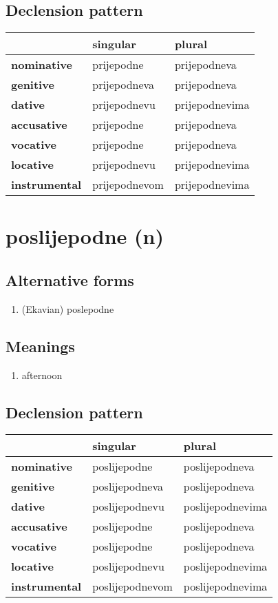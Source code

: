 \subsection*{Declension pattern}
\begin{tabularx}{\linewidth}{Xll}
\toprule
{} &       singular &          plural \\
\midrule
\textbf{nominative  } &     prijepodne &    prijepodneva \\
\textbf{genitive    } &   prijepodneva &    prijepodneva \\
\textbf{dative      } &   prijepodnevu &  prijepodnevima \\
\textbf{accusative  } &     prijepodne &    prijepodneva \\
\textbf{vocative    } &     prijepodne &    prijepodneva \\
\textbf{locative    } &   prijepodnevu &  prijepodnevima \\
\textbf{instrumental} &  prijepodnevom &  prijepodnevima \\
\bottomrule
\end{tabularx}

\filbreak
\section{poslijepodne (n)}
\subsection*{Alternative forms}
\begin{enumerate}
\item (Ekavian) poslepodne
\end{enumerate}
\subsection*{Meanings}
\begin{enumerate}
\item afternoon
\end{enumerate}
\subsection*{Declension pattern}
\begin{tabularx}{\linewidth}{Xll}
\toprule
{} &         singular &            plural \\
\midrule
\textbf{nominative  } &     poslijepodne &    poslijepodneva \\
\textbf{genitive    } &   poslijepodneva &    poslijepodneva \\
\textbf{dative      } &   poslijepodnevu &  poslijepodnevima \\
\textbf{accusative  } &     poslijepodne &    poslijepodneva \\
\textbf{vocative    } &     poslijepodne &    poslijepodneva \\
\textbf{locative    } &   poslijepodnevu &  poslijepodnevima \\
\textbf{instrumental} &  poslijepodnevom &  poslijepodnevima \\
\bottomrule
\end{tabularx}

